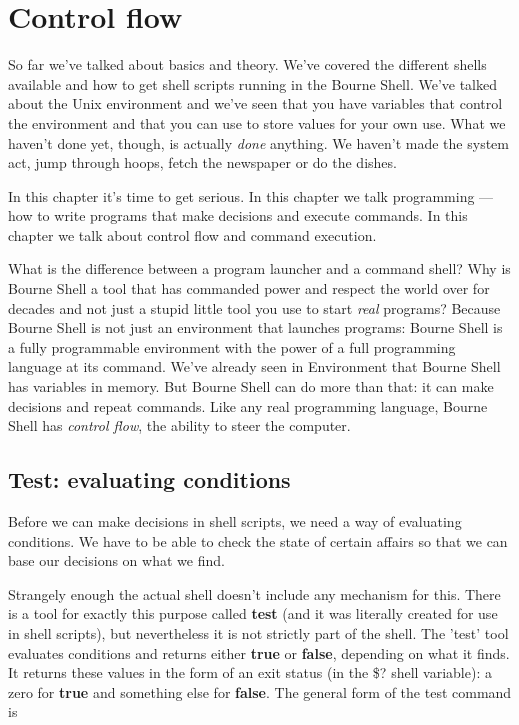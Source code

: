 \section{Control flow}
So far we've talked about basics and theory. We've covered the different shells
available and how to get shell scripts running in the Bourne Shell. We've
talked about the Unix environment and we've seen that you have variables that
control the environment and that you can use to store values for your own use.
What we haven't done yet, though, is actually \emph{done} anything. We haven't
made the system act, jump through hoops, fetch the newspaper or do the dishes.

In this chapter it's time to get serious. In this chapter we talk programming
--- how to write programs that make decisions and execute commands. In this
chapter we talk about control flow and command execution.

What is the difference between a program launcher and a command shell? Why is
Bourne Shell a tool that has commanded power and respect the world over for
decades and not just a stupid little tool you use to start \emph{real}
programs? Because Bourne Shell is not just an environment that launches
programs: Bourne Shell is a fully programmable environment with the power of a
full programming language at its command. We've already seen in Environment
that Bourne Shell has variables in memory. But Bourne Shell can do more than
that: it can make decisions and repeat commands. Like any real programming
language, Bourne Shell has \emph{control flow}, the ability to steer the
computer.

\subsection{Test: evaluating conditions}
Before we can make decisions in shell scripts, we need a way of evaluating
conditions. We have to be able to check the state of certain affairs so that we
can base our decisions on what we find.

Strangely enough the actual shell doesn't include any mechanism for this. There
is a tool for exactly this purpose called \textbf{test} (and it was literally
created for use in shell scripts), but nevertheless it is not strictly part of
the shell. The 'test' tool evaluates conditions and returns either
\textbf{true} or \textbf{false}, depending on what it finds. It returns these
values in the form of an exit status (in the \$? shell variable): a zero for
\textbf{true} and something else for \textbf{false}. The general form of the
test command is

